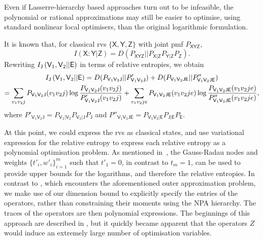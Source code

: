 \documentclass[10pt, a4paper]{article}
\numberwithin{equation}{section} %
\theoremstyle{definition}
\theoremstyle{plain}
\newcommand{\?}{\mathrel{?}} %
\newcommand{\crv}[1]{\mathsf{#1}}
\begin{document}
                  Even if Lasserre-hierarchy based approaches turn out to be infeasible, the polynomial or rational approximations may still be easier to optimise, using standard nonlinear local optimisers, than the original logarithmic formulation.

                  It is known that, for classical rvs \(\{\crv{X}, \crv{Y}, \crv{Z}\}\) with joint pmf \(P_{\crv{XYZ}}\),
                  \[ I(\crv{X}:\crv{Y}|\crv{Z}) = D\left(P_{\crv{XYZ}}||P_{\crv{X}|\crv{Z}} P_{\crv{Y}|\crv{Z}} P_{\crv{Z}}\right). \]
                  Rewriting \(\splitkey{\crv{V}_1,\crv{V}_2}{\crv{E}}\) in terms of relative entropies, we obtain
                  \begin{gather}
                    \splitkey{\crv{V}_1,\crv{V}_2}{\crv{E}} =  D(P_{\crv{V}_1\crv{V}_2\crv{J}}||P'_{\crv{V}_1\crv{V}_2\crv{J}})
                    + D(P_{\crv{V}_1\crv{V}_2\crv{JE}}||P''_{\crv{V}_1\crv{V}_2\crv{JE}}) \\
                    = \sum_{v_1v_2j} P_{\crv{V}_1\crv{V}_2\crv{J}}(v_1v_2j) \log \frac{P_{\crv{V}_1\crv{V}_2\crv{J}}(v_1v_2j)}{P'_{\crv{V}_1\crv{V}_2\crv{J}}(v_1v_2j)} + \sum_{v_1v_2je} P_{\crv{V}_1\crv{V}_2\crv{JE}}(v_1v_2je) \log \frac{P_{\crv{V}_1\crv{V}_2\crv{JE}}(v_1v_2je)}{P''_{\crv{V}_1\crv{V}_2\crv{JE}}(v_1v_2je)},
                  \end{gather}
                  where \(P'_{\crv{V}_1\crv{V}_2\crv{J}} = P_{\crv{V_1|V_2}} P_{\crv{V}_2|\crv{J}} P_{\crv{J}}\) and \(P''_{\crv{V}_1\crv{V}_2\crv{JE}} = P_{\crv{V_1V_2|E}} P_{\crv{J|E}} P_{\crv{E}}\).

                  At this point, we could express the rvs as classical states, and use variational expression for the relative entropy  to express each relative entropy as a polynomial optimisation problem. As mentioned in~\cite[Remark 2.10]{BFF_QRE}, the Gauss-Radau nodes and weights \({\{t'_i, w'_i\}}_{i=1}^m\) such that \(t'_1 = 0\), in contrast to \(t_m = 1\), can be used to provide upper bounds for the logarithms, and therefore the relative entropies. In contrast to , which encounters the aforementioned outer approximation problem, we make use of our dimension bound to explicitly specify the entries of the operators, rather than constraining their moments using the NPA hierarchy. The traces of the operators are then polynomial expressions. The beginnings of this approach are described in , but it quickly became apparent that the operators \(Z\) would induce an extremely large number of optimisation variables.
\end{document}
